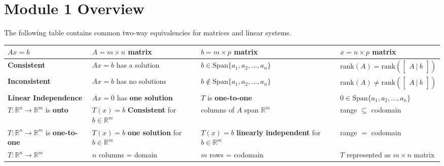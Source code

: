 \documentclass[12pt, letterpaper]{article}
\begin{document}
\section*{Module 1 Overview}

The following table contains common two-way equivalencies for
matrices and linear systems.
\begin{table}[h]
  \begin{center}
    \scriptsize

    \begin{tabularx}{\linewidth}{|X|X|X|X|}
      \hline
      $ Ax = b $ & $ A = m \times n $ matrix & $ b = m \times p $
      matrix & $ x = n \times p $ matrix \\
      \hline
      \textbf{Consistent} & $ Ax = b $ has a solution & $ b \in
      \textrm{Span}\{a_1, a_2, \hdots, a_n \} $ & $ \textrm{rank}(A)
      = \textrm{rank}(
        \begin{bmatrix} A \:|\: b
      \end{bmatrix}) $ \\
      \hline
      \textbf{Inconsistent} & $ Ax = b $ has no solutions & $ b
      \not\in \textrm{Span}\{a_1, a_2, \hdots, a_n \} $ & $
      \textrm{rank}(A) \not= \textrm{rank}(
        \begin{bmatrix} A \:|\: b
      \end{bmatrix}) $ \\
      \hline
      \textbf{Linear Independence} & $ Ax = 0 $ has \textbf{one
      solution} & $ T $ is \textbf{one-to-one} & $ 0 \in
      \textrm{Span}\{a_1, a_2, \hdots, a_n \} $ \\
      \hline
      $ T: \mathbb{R}^n \rightarrow \mathbb{R}^m $ is \textbf{onto} &
      $ T(x) = b $ \textbf{Consistent} for $ b \in \mathbb{R}^m $ &
      columns of $ A $ span $ \mathbb{R}^m $ & range $ \subseteq $ codomain  \\
      \hline
      $ T: \mathbb{R}^n \rightarrow \mathbb{R}^m $ is
      \textbf{one-to-one} & $ T(x) = b $ \textbf{one solution} for $
      b \in \mathbb{R}^m $ & $ T(x) = b $ \textbf{linearly
      independent} for $ b \in \mathbb{R}^m $ & range $ = $ codomain \\
      \hline
      $ T: \mathbb{R}^n \rightarrow \mathbb{R}^m $ & $ n $ columns =
      domain & $ m $ rows = codomain & $ T $ represented as $ m
      \times n $ matrix \\
      \hline
    \end{tabularx}

  \end{center}
\end{table}
\FloatBarrier
\end{document}
